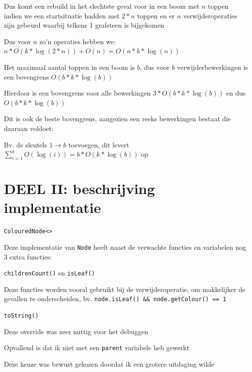 \documentclass{article}
\def\code#1{\texttt{#1}}
\begin{document}
Dus komt een rebuild in het slechtste geval voor in een boom met $n$ toppen indien we een startsituatie hadden met $2*n$ toppen en er $n$ verwijderoperaties zijn gebeurd waarbij telkens 1 grafsteen is bijgekomen

Dus voor $n$ zo'n operaties hebben we: $n * O(k * \log (2*n)) + O(n) = O(n * k * \log(n))$

Het maximaal aantal toppen in een boom is $b$, dus voor $b$ verwijderbewerkingen is een bovengrens $O(b * k * \log (b))$
\vspace{0.2cm}

Hierdoor is een bovengrens voor alle bewerkingen $3 * O(b * k * \log (b))$ en dus $O(b * k * \log (b))$

Dit is ook de beste bovengrens, aangezien een reeks bewerkingen bestaat die daaraan voldoet: 

Bv. de sleutels $1 \rightarrow b$ toevoegen, dit levert $\sum_{i=1}^{b} O(\log (i)) = b * O(k *\log (b))$ op

\newpage

\section*{\centering DEEL II: beschrijving implementatie}
\vspace{1cm}

\Large \code{ColouredNode<>}

\vspace{0.3cm}

\large

Deze implementatie van \code{Node} heeft naast de verwachte functies en variabelen nog 3 extra functies:

\vspace{0.2cm}

\code{childrenCount()} en \code{isLeaf()}

Deze functies worden vooral gebruikt bij de verwijderoperatie, om makkelijker de gevallen te onderscheiden, bv. \code{node.isLeaf() \&\& node.getColour() == 1}

\vspace{0.2cm}

\code{toString()}

Deze override was zeer nuttig voor het debuggen

\vspace{0.2cm}

Opvallend is dat ik niet met een \code{parent} variabele heb gewerkt

Deze keuze was bewust gekozen doordat ik een grotere uitdaging wilde
\end{document}
